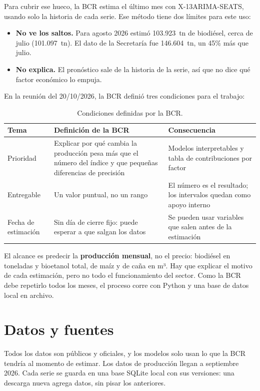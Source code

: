 \documentclass[11pt,a4paper]{article}
\begin{document}
Para cubrir ese hueco, la BCR estima el último mes con X-13ARIMA-SEATS, usando solo la historia de cada serie. Ese método tiene dos límites para este uso:

\begin{itemize}
  \item \textbf{No ve los saltos.} Para agosto 2026 estimó 103.923~tn de biodiésel, cerca de julio (101.097~tn). El dato de la Secretaría fue 146.604~tn, un 45\% más que julio.
  \item \textbf{No explica.} El pronóstico sale de la historia de la serie, así que no dice qué factor económico lo empuja.
\end{itemize}

En la reunión del 20/10/2026, la BCR definió tres condiciones para el trabajo:

\begin{table}[htbp]
\centering\small
\begin{tabularx}{\textwidth}{@{}P{2.8cm}LL@{}}
\toprule
\textbf{Tema} & \textbf{Definición de la BCR} & \textbf{Consecuencia}\\
\midrule
Prioridad & Explicar por qué cambia la producción pesa más que el número del índice y que pequeñas diferencias de precisión & Modelos interpretables y tabla de contribuciones por factor\\
Entregable & Un valor puntual, no un rango & El número es el resultado; los intervalos quedan como apoyo interno\\
Fecha de estimación & Sin día de cierre fijo: puede esperar a que salgan los datos & Se pueden usar variables que salen antes de la estimación\\
\bottomrule
\end{tabularx}
\caption{Condiciones definidas por la BCR.}
\end{table}

El alcance es predecir la \textbf{producción mensual}, no el precio: biodiésel en toneladas y bioetanol total, de maíz y de caña en m³. Hay que explicar el motivo de cada estimación, pero no todo el funcionamiento del sector. Como la BCR debe repetirlo todos los meses, el proceso corre con Python y una base de datos local en archivo.

\section{Datos y fuentes}

Todos los datos son públicos y oficiales, y los modelos solo usan lo que la BCR tendría al momento de estimar. Los datos de producción llegan a septiembre 2026. Cada serie se guarda en una base SQLite local con sus versiones: una descarga nueva agrega datos, sin pisar los anteriores.
\end{document}
